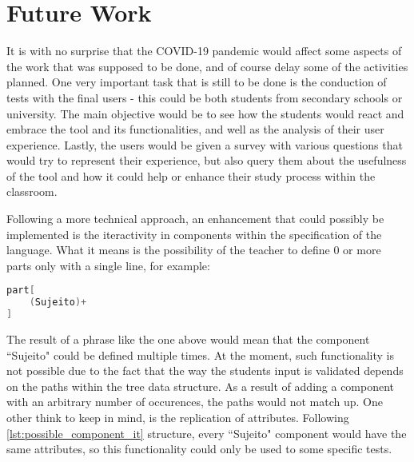 \section{Future Work}

It is with no surprise that the COVID-19 pandemic would affect some aspects of the work that was supposed to be done, and of course delay some of the activities planned.
One very important task that is still to be done is the conduction of tests with the final users - this could be both students from secondary schools or university.
The main objective would be to see how the students would react and embrace the tool and its functionalities, and well as the analysis of their user experience.
Lastly, the users would be given a survey with various questions that would try to represent their experience,
but also query them about the usefulness of the tool and how it could help or enhance their study process within the classroom.

Following a more technical approach, an enhancement that could possibly be implemented is the iteractivity in components within the specification of the language.
What it means is the possibility of the teacher to define 0 or more parts only with a single line, for example:

\begin{center}
\begin{minipage}{8cm}
\begin{lstlisting}[language=java, basicstyle=\small, label={lst:possible_component_it}, caption=Example of a possible component iteractivity syntax.]
part[
    (Sujeito)+
]
\end{lstlisting}
\end{minipage}
\end{center}

The result of a phrase like the one above would mean that the component ``Sujeito" could be defined multiple times.
At the moment, such functionality is not possible due to the fact that the way the students input is validated depends on the paths within the tree data structure.
As a result of adding a component with an arbitrary number of occurences, the paths would not match up.
One other think to keep in mind, is the replication of attributes.
Following \autoref{lst:possible_component_it} structure, every ``Sujeito" component would have the same attributes, 
so this functionality could only be used to some specific tests.



